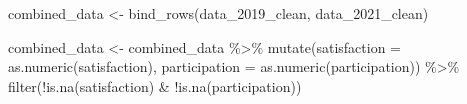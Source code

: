 \documentclass[
  letterpaper,
  DIV=11,
  numbers=noendperiod]{scrartcl}
\newenvironment{Shaded}{\begin{snugshade}}{\end{snugshade}}
\newcommand{\AttributeTok}[1]{\textcolor[rgb]{0.40,0.45,0.13}{#1}}
\newcommand{\DecValTok}[1]{\textcolor[rgb]{0.68,0.00,0.00}{#1}}
\newcommand{\FunctionTok}[1]{\textcolor[rgb]{0.28,0.35,0.67}{#1}}
\newcommand{\NormalTok}[1]{\textcolor[rgb]{0.00,0.23,0.31}{#1}}
\newcommand{\OtherTok}[1]{\textcolor[rgb]{0.00,0.23,0.31}{#1}}
\newcommand{\SpecialCharTok}[1]{\textcolor[rgb]{0.37,0.37,0.37}{#1}}
\newcommand{\StringTok}[1]{\textcolor[rgb]{0.13,0.47,0.30}{#1}}
\begin{document}
\begin{Shaded}
\begin{Highlighting}[]
\NormalTok{combined\_data }\OtherTok{\textless{}{-}} \FunctionTok{bind\_rows}\NormalTok{(data\_2019\_clean, data\_2021\_clean)}
\end{Highlighting}
\end{Shaded}

\begin{Shaded}
\begin{Highlighting}[]
\NormalTok{combined\_data }\OtherTok{\textless{}{-}}\NormalTok{ combined\_data }\SpecialCharTok{\%\textgreater{}\%}
  \FunctionTok{mutate}\NormalTok{(}\AttributeTok{satisfaction =} \FunctionTok{as.numeric}\NormalTok{(satisfaction),}
         \AttributeTok{participation =} \FunctionTok{as.numeric}\NormalTok{(participation)) }\SpecialCharTok{\%\textgreater{}\%}
  \FunctionTok{filter}\NormalTok{(}\SpecialCharTok{!}\FunctionTok{is.na}\NormalTok{(satisfaction) }\SpecialCharTok{\&} \SpecialCharTok{!}\FunctionTok{is.na}\NormalTok{(participation))}
\end{Highlighting}
\end{Shaded}

\begin{Shaded}
\end{Shaded}
\end{document}
